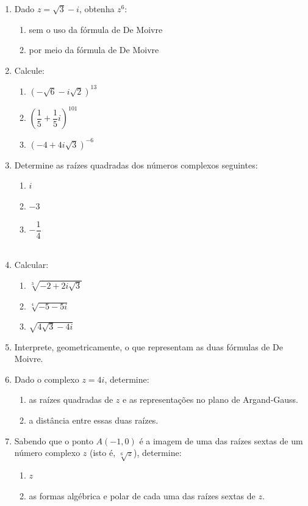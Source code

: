 \documentclass[a4paper, 11pt]{article}
\begin{document}
\begin{enumerate}
\item Dado $z = \sqrt{3} - i$, obtenha $z^6$:
	\begin{enumerate}
	\item sem o uso da fórmula de De Moivre
	\item por meio da fórmula de De Moivre
	\end{enumerate}

\item Calcule:
	\begin{enumerate}
	\item $(-\sqrt{6} -i\sqrt{2})^{13}$
	\item $(\dfrac{1}{5} + \dfrac{1}{5}i)^{101}$
	\item $(-4 + 4i\sqrt{3})^{-6}$
	\end{enumerate}

\item Determine as raízes quadradas dos números complexos seguintes:
	\begin{enumerate}
	\item $i$
	\item $-3$
	\item $-\dfrac{1}{4}$
	\\
	\\
	\end{enumerate}

\item Calcular:
	\begin{enumerate}
	\item $\sqrt[3]{-2+2i\sqrt{3}}$
	\item $\sqrt[4]{-5 -5i}$
	\item $\sqrt{4\sqrt{3} - 4i}$
	\end{enumerate}

\item Interprete, geometricamente, o que representam as duas fórmulas de De Moivre.

\item Dado o complexo $z = 4i$, determine:
	\begin{enumerate}
	\item as raízes quadradas de $z$ e as representações no plano de Argand-Gauss.
	\item a distância entre essas duas raízes.
	\end{enumerate}

\item Sabendo que o ponto $A(-1,0)$ é a imagem de uma das raízes sextas de um número complexo $z$ (isto é, $\sqrt[6]{z}$), determine:
	\begin{enumerate}
	\item $z$
	\item as formas algébrica e polar de cada uma das raízes sextas de $z$.
	\end{enumerate}


\end{enumerate}
\end{document}
